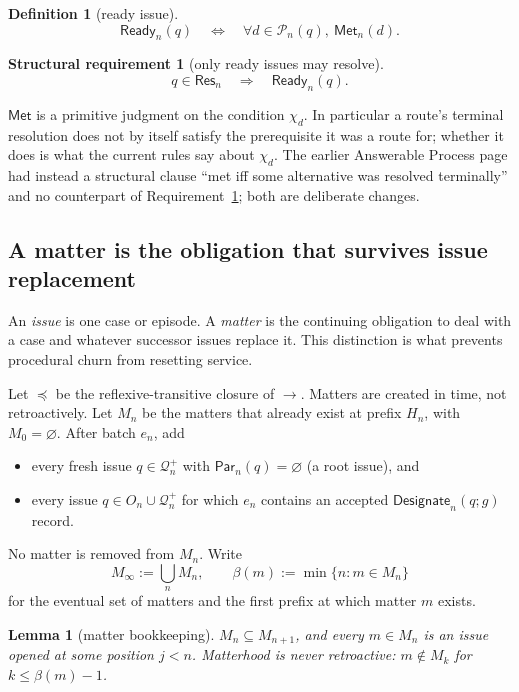 \documentclass[11pt]{article}
\newtheorem{lemma}{Lemma}
\theoremstyle{definition}
\newtheorem{requirement}{Structural requirement}
\newtheorem*{definition}{Definition}
\theoremstyle{remark}
\newcommand{\Met}{\mathsf{Met}}
\newcommand{\Designate}{\mathsf{Designate}}
\newcommand{\Pre}{\mathcal P}
\newcommand{\Ready}{\mathsf{Ready}}
\newcommand{\ResSet}{\mathsf{Res}}
\newcommand{\Par}{\mathsf{Par}}
\newcommand{\Born}{\mathcal Q^{+}}
\begin{document}
\begin{definition}[ready issue]
\[
 \Ready_n(q)
 \quad\Longleftrightarrow\quad
 \forall d\in\Pre_n(q),\ \Met_n(d).
\]
\end{definition}

\begin{requirement}[only ready issues may resolve]\label{req:ready}
\[
 q\in\ResSet_n\quad\Longrightarrow\quad\Ready_n(q).
\]
\end{requirement}

$\Met$ is a primitive judgment on the condition $\chi_d$. In particular a
route's terminal resolution does not by itself satisfy the prerequisite it was
a route for; whether it does is what the current rules say about $\chi_d$. The
earlier Answerable Process page had instead a structural clause ``met iff some
alternative was resolved terminally'' and no counterpart of
Requirement~\ref{req:ready}; both are deliberate changes.

\subsection{A matter is the obligation that survives issue replacement}

An \emph{issue} is one case or episode. A \emph{matter} is the continuing
obligation to deal with a case and whatever successor issues replace it.
This distinction is what prevents procedural churn from resetting service.

Let $\preceq$ be the reflexive-transitive closure of $\to$. Matters are created
in time, not retroactively. Let $M_n$ be the matters that already exist at
prefix $H_n$, with $M_0=\varnothing$. After batch $e_n$, add
\begin{itemize}[itemsep=1pt,topsep=2pt]
 \item every fresh issue $q\in\Born_n$ with $\Par_n(q)=\varnothing$ (a root
       issue), and
 \item every issue $q\in O_n\cup\Born_n$ for which $e_n$ contains an accepted
       $\Designate_n(q;g)$ record.
\end{itemize}
No matter is removed from $M_n$. Write
\[
 M_\infty:=\bigcup_n M_n,
 \qquad
 \beta(m):=\min\{n:m\in M_n\}
\]
for the eventual set of matters and the first prefix at which matter $m$
exists.

\begin{lemma}[matter bookkeeping]\label{lem:matter-bookkeeping}
$M_n\subseteq M_{n+1}$, and every $m\in M_n$ is an issue opened at some
position $j<n$. Matterhood is never retroactive: $m\notin M_k$ for
$k\le\beta(m)-1$.
\end{lemma}
\end{document}
